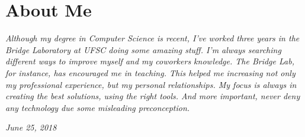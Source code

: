 \documentclass{friggeri-cv}
\begin{document}
\section{About Me}
\emph{Although my degree in Computer Science is recent, I've worked three years in the Bridge Laboratory at UFSC doing some amazing stuff.
I'm always searching different ways to improve myself and my coworkers knowledge. The Bridge Lab, for instance, has encouraged me in teaching. This helped me increasing not only my professional experience, but my personal relationships.
My focus is always in creating the best solutions, using the right tools. And more important, never deny any technology due some misleading preconception.
}
\begin{flushright}
\emph{June 25, 2018}
\end{flushright}
\end{document}

